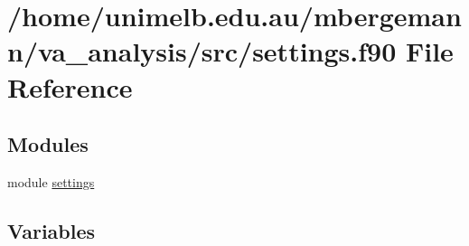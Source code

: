 \hypertarget{settings_8f90}{}\section{/home/unimelb.edu.\+au/mbergemann/va\+\_\+analysis/src/settings.f90 File Reference}
\label{settings_8f90}
\subsection*{Modules}
\begin{DoxyCompactItemize}
\item 
module \hyperlink{namespacesettings}{settings}
\end{DoxyCompactItemize}
\subsection*{Variables}
